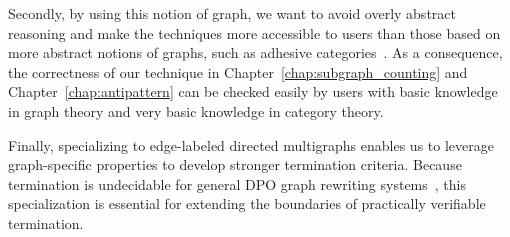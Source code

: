  Secondly, by using this notion of graph, we want to avoid overly abstract reasoning and make the techniques more accessible to users than those based on more abstract notions of graphs, such as adhesive categories~\cite{lack2004adhesive}.
 As a consequence, the correctness of our technique in Chapter~\ref{chap:subgraph_counting} and Chapter~\ref{chap:antipattern} can be checked easily by users with basic knowledge in graph theory and very basic knowledge in category theory.

Finally, specializing to edge-labeled directed multigraphs enables us to leverage graph-specific properties to develop stronger termination criteria. Because termination is undecidable for general DPO graph rewriting systems~\cite{plump1998terminationundecidable}, this specialization is essential for extending the boundaries of practically verifiable termination. 

 

